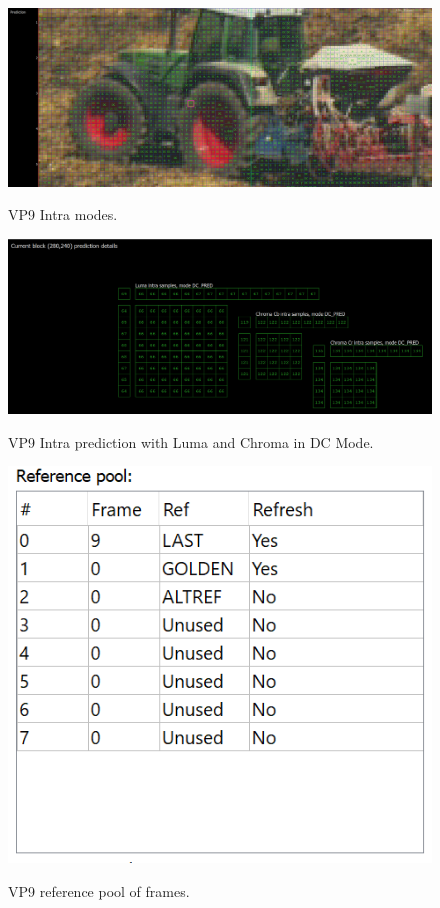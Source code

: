 \documentclass{book}
\begin{document}
\begin{figure}[hbt!]
	\centering
	{\includegraphics[width=\columnwidth]{pictures/ch5/VP9-IntraModes.png}
		\label{fig:VP9-IntraModes}}
	\caption{VP9 Intra modes.}
\end{figure}
\begin{figure}[hbt!]
	\centering
	{\includegraphics[width=\columnwidth]{pictures/ch5/VP9-Intra-Mode-Detail.png}
		\label{fig:VP9-IntraModes-Detail}}
	\caption{VP9 Intra prediction with Luma and Chroma in DC Mode.}
\end{figure} 

\begin{figure}[hbt!]
	\centering
	{\includegraphics[width=1.9 true in]{pictures/ch5/VP9-Ref-pool.png}
		\label{fig:VP9-Refpool}}
	\caption{VP9 reference pool of frames.}
\end{figure}
\end{document}
